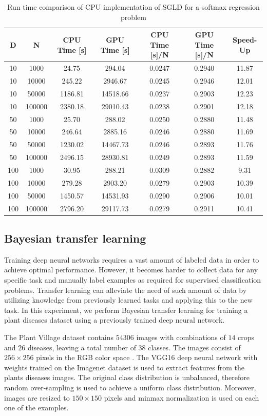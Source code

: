 \documentclass[9pt,lineno]{crone}
\begin{document}
\begin{table}[h]
	\centering
	\begin{tabular}{|c|c|c|c|c|c|c|}
		\hline 
		D & N & CPU Time [s] & GPU Time [s] & CPU Time [s]/N & GPU Time [s]/N & Speed-Up\\ 
		\hline 		
10	& 1000& 	24.75& 294.04  & 0.0247& 0.2940& 11.87\\
10	& 10000& 	245.22& 2946.67	& 0.0245& 0.2946& 12.01\\
10	& 50000& 	1186.81& 14518.66 & 0.0237& 0.2903& 12.23\\
10	& 100000	& 2380.18& 29010.43	& 0.0238& 0.2901& 12.18\\
\hline
50	& 1000	& 25.70& 288.02	& 0.0250& 0.2880& 11.48\\
50	& 10000	& 246.64& 2885.16	& 0.0246& 0.2880& 11.69\\
50	& 50000	& 1230.02& 14467.73	& 0.0246& 0.2893& 11.76\\
50 & 	100000	& 2496.15& 28930.81	& 0.0249& 0.2893& 11.59\\
\hline
100	& 1000	& 30.95& 288.21	& 0.0309& 0.2882& 9.31\\
100	& 10000	& 279.28& 2903.20& 0.0279& 0.2903& 10.39\\
100	& 50000	& 1450.57& 14531.93& 0.0290& 0.2906& 10.01\\
100	& 100000& 	2796.20& 29117.73& 0.0279& 0.2911& 10.41\\

		\hline 
\end{tabular}
\caption{Run time comparison of CPU implementation of SGLD for a softmax regression problem}
\label{tab:sgld} 
\end{table}

\subsection{Bayesian transfer learning}
Training deep neural networks requires a vast amount of labeled data in order to achieve optimal performance. However, it becomes harder to collect data for any specific task and manually label examples as required for supervised classification problems. Transfer learning can alleviate the need of such amount of data by utilizing knowledge from previously learned tasks and applying this to the new task. In this experiment, we perform Bayesian transfer learning for training a plant diseases dataset using a previously trained deep neural network.

The Plant Village dataset contains $54306$ images with combinations of $14$ crops and $26$ diseases, leaving a total number of $38$ classes. The images consist of $256 \times 256$ pixels in the RGB color space \cite{mohanty2016using}.  The VGG16 deep neural network with weights trained on the Imagenet dataset is used to extract features from the plants diseases images. The original class distribution is unbalanced, therefore random over-sampling is used to achieve a uniform class distribution. Moreover, images are resized to $150 \times 150$ pixels and min\-max normalization is used on each one of the examples.
\end{document}
